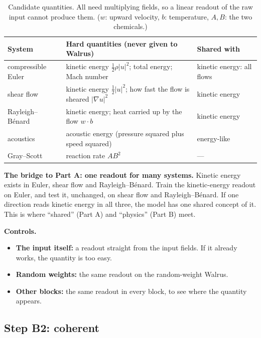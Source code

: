 \documentclass[11pt,a4paper]{article}
\begin{document}
\begin{table}[H]
\centering
\renewcommand{\arraystretch}{1.5}
\small
\begin{tabularx}{\textwidth}{>{\raggedright\arraybackslash}p{3.3cm} >{\raggedright\arraybackslash}X >{\raggedright\arraybackslash}p{3.8cm}}
\toprule
\textbf{System} & \textbf{Hard quantities (never given to Walrus)} & \textbf{Shared with} \\
\midrule
compressible Euler & kinetic energy $\tfrac12 \rho |u|^2$; total energy; Mach number & kinetic energy: all flows \\
shear flow & kinetic energy $\tfrac12 |u|^2$; how fast the flow is sheared $|\nabla u|^2$ & kinetic energy \\
Rayleigh--B\'enard & kinetic energy; heat carried up by the flow $w \cdot b$ & kinetic energy \\
acoustics & acoustic energy (pressure squared plus speed squared) & energy-like \\
Gray--Scott & reaction rate $A B^2$ & --- \\
\bottomrule
\end{tabularx}
\caption{Candidate quantities. All need multiplying fields, so a linear readout of the raw input cannot produce them.
($w$: upward velocity, $b$: temperature, $A, B$: the two chemicals.)}
\end{table}

\textbf{The bridge to Part A: one readout for many systems.} Kinetic energy exists in Euler, shear flow and Rayleigh--B\'enard.
Train the kinetic-energy readout on Euler, and test it, unchanged, on shear flow and Rayleigh--B\'enard.
If one direction reads kinetic energy in all three, the model has one shared concept of it.
This is where ``shared'' (Part A) and ``physics'' (Part B) meet.

\textbf{Controls.}
\begin{itemize}[itemsep=0.4em]
  \item \textbf{The input itself:} a readout straight from the input fields. If it already works, the quantity is too easy.
  \item \textbf{Random weights:} the same readout on the random-weight Walrus.
  \item \textbf{Other blocks:} the same readout in every block, to see where the quantity appears.
\end{itemize}

\subsection*{Step B2: coherent}
\end{document}
